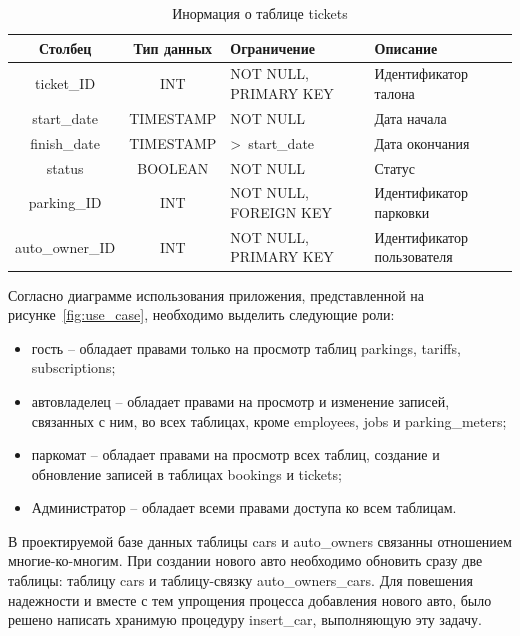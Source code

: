 \begin{table}[H]
	\begin{center}
		\begin{center}
			\caption{\label{tab:tickets}Инормация о таблице tickets}
		\end{center}
		\begin{tabular}{|c|c|p{3cm}|p{4cm}|}
			\hline 
			Столбец & Тип данных & Ограничение & Описание \\ \hline
			ticket\_ID & INT & NOT NULL, PRIMARY KEY & Идентификатор талона \\ \hline
	        start\_date & TIMESTAMP  & NOT NULL & Дата начала  \\ \hline
	        finish\_date &  TIMESTAMP & >~start\_date & Дата окончания  \\ \hline
	        status & BOOLEAN & NOT NULL & Статус \\ \hline
	        parking\_ID & INT & NOT NULL, FOREIGN KEY & Идентификатор парковки \\ \hline
	        auto\_owner\_ID & INT & NOT NULL, PRIMARY KEY & Идентификатор пользователя \\ \hline
		\end{tabular}
	\end{center}
\end{table}

Согласно диаграмме использования приложения, представленной на рисунке~\ref{fig:use_case}, необходимо выделить следующие роли:
\begin{itemize}
	\item гость -- обладает правами только на просмотр таблиц parkings, tariffs, subscriptions;
	\item автовладелец -- обладает правами на просмотр и изменение записей, связанных с ним, во всех таблицах, кроме employees, jobs и parking\_meters;
	\item паркомат -- обладает правами на просмотр всех таблиц, создание и обновление записей в таблицах bookings и tickets;
	\item Администратор -- обладает всеми правами доступа ко всем таблицам.
\end{itemize}

В проектируемой базе данных таблицы cars и auto\_owners связанны отношением многие-ко-многим. 
При создании нового авто необходимо обновить сразу две таблицы: таблицу cars и таблицу-связку auto\_owners\_cars. 
Для повешения надежности и вместе с тем упрощения процесса добавления нового авто, было решено написать хранимую процедуру insert\_car, выполняющую эту задачу.

